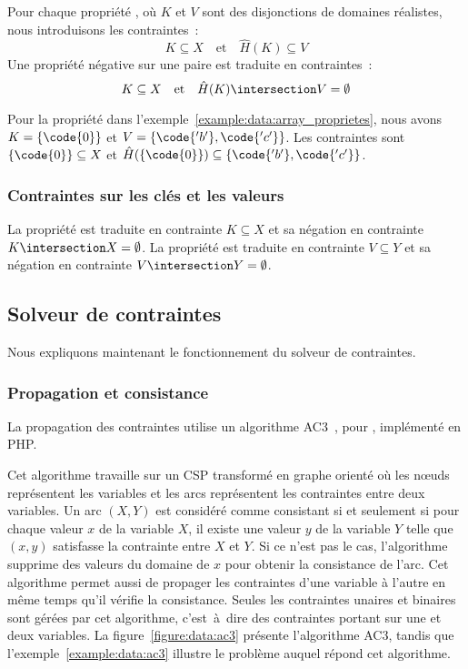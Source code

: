 Pour chaque propriété , où $K$ et $V$ sont des disjonctions de
domaines réalistes, nous introduisons les contraintes~:
%
$$K \subseteq X \quad\mathrm{et}\quad \hat{H}(K) \subseteq V$$
%
Une propriété négative sur une paire  est traduite en
contraintes~:
%
$$K \subseteq X \quad\mathrm{et}\quad \hat{H}(K) \intersection V = \emptyset$$

Pour la propriété  dans
l'exemple~\ref{example:data:array_proprietes}, nous avons $K = \{\code{0}\}$ et
$V = \{\code{'b'}, \code{'c'}\}$. Les contraintes sont $\{\code{0}\} \subseteq
X$ et $\hat{H}(\{\code{0}\}) \subseteq \{\code{'b'}, \code{'c'}\}$.

\subsubsection{Contraintes sur les clés et les valeurs}

La propriété  est traduite en contrainte $K \subseteq X$ et sa
négation  en contrainte $K \intersection X = \emptyset$. La
propriété  est traduite en contrainte $V \subseteq Y$ et sa
négation  en contrainte $V \intersection Y = \emptyset$.

\subsection{Solveur de contraintes}
\label{subsection:data:solver}

Nous expliquons maintenant le fonctionnement du solveur de contraintes.

\subsubsection{Propagation et consistance}

La propagation des contraintes utilise un algorithme AC3~,
pour , implémenté en PHP.

Cet algorithme travaille sur un CSP transformé en graphe orienté où les nœuds
représentent les variables et les arcs représentent les contraintes entre deux
variables. Un arc $(X, Y)$ est considéré comme consistant si et seulement si
pour chaque valeur $x$ de la variable $X$, il existe une valeur $y$ de la
variable $Y$ telle que $(x, y)$ satisfasse la contrainte entre $X$ et $Y$.  Si
ce n'est pas le cas, l'algorithme supprime des valeurs du domaine de $x$ pour
obtenir la consistance de l'arc. Cet algorithme permet aussi de propager les
contraintes d'une variable à l'autre en même temps qu'il vérifie la consistance.
Seules les contraintes unaires et binaires sont gérées par cet algorithme,
c'est~à~dire des contraintes portant sur une et deux variables. La
figure~\ref{figure:data:ac3} présente l'algorithme AC3, tandis que
l'exemple~\ref{example:data:ac3} illustre le problème auquel répond cet
algorithme.

